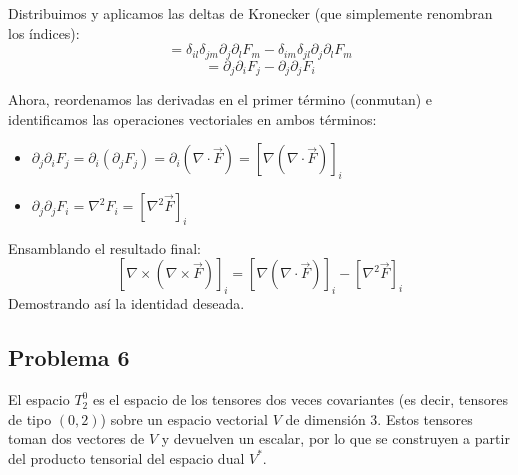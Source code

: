 \documentclass[11pt,spanish]{article}
\begin{document}
\begin{itemize}
Distribuimos y aplicamos las deltas de Kronecker (que simplemente renombran los índices):
$$= \delta_{il} \delta_{jm} \partial_j \partial_l F_m - \delta_{im} \delta_{jl} \partial_j \partial_l F_m$$
$$= \partial_j \partial_i F_j - \partial_j \partial_j F_i$$

Ahora, reordenamos las derivadas en el primer término (conmutan) e identificamos las operaciones vectoriales en ambos términos:
\begin{itemize}
\item $\partial_j \partial_i F_j = \partial_i (\partial_j F_j) = \partial_i (\nabla \cdot \vec{F}) = [\nabla(\nabla \cdot \vec{F})]_i$
\item $\partial_j \partial_j F_i = \nabla^2 F_i = [\nabla^2 \vec{F}]_i$
\end{itemize}

Ensamblando el resultado final:
$$[\nabla \times (\nabla \times \vec{F})]_i = [\nabla(\nabla \cdot \vec{F})]_i - [\nabla^2 \vec{F}]_i$$
Demostrando así la identidad deseada.

\end{itemize}

\subsection*{Problema 6}


El espacio $T_2^0$  es el espacio de los tensores dos veces covariantes (es decir, tensores de tipo $(0,2)$) sobre un espacio vectorial $V$ de dimensión 3. Estos tensores toman dos vectores de $V$ y devuelven un escalar, por lo que se construyen a partir del producto tensorial del espacio dual $V^*$.
\end{document}
